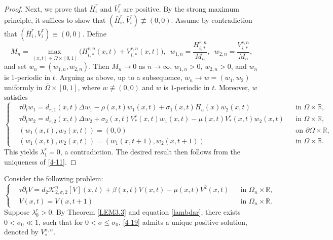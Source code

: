 \documentclass[11pt,reqno]{amsart}
\numberwithin{equation}{section}
\begin{document}
\begin{proof}
Next, we prove that $\bar{H}_{i}^{r}$ and $\bar{V}_{i}^{r}$ are positive. By the strong maximum principle, it suffices to show that
$(\bar{H}_{i}^{r},\bar{V}_{i}^{r})\not\equiv(0,0)$.
Assume by contradiction that $(\bar{H}_{i}^{r},\bar{V}_{i}^{r})\equiv(0,0)$.
Define
\begin{equation*}
M_{n}=\max_{(x,t)\in\bar{\Omega}\times[0,1]}
\big(H_{i,*}^{r,n}(x,t)+V_{i,*}^{r,n}(x,t)\big),
\enspace
w_{1,n}=\frac{H_{i,*}^{r,n}}{M_{n}},\enspace
w_{2,n}=\frac{V_{i,*}^{r,n}}{M_{n}},
\end{equation*}
and set $w_{n}=(w_{1,n},w_{2,n})$.
Then $M_{n}\to 0$ as $n\to\infty$, $w_{1,n}>0$, $w_{2,n}>0$, and $w_{n}$ is $1$-periodic in $t$.
Arguing as above, up to a subsequence, $w_{n}\to w=(w_{1},w_{2})$ uniformly in
$\bar{\Omega}\times[0,1]$, where $w\not\equiv(0,0)$ and $w$ is $1$-periodic in $t$.
Moreover, $w$ satisfies
\begin{equation*}
\left\{
\begin{aligned}
&\tau \partial_{t} w_{1} = d_{r,1}(x,t)\Delta w_{1}-\rho(x,t) w_{1}(x,t)+\sigma_{1}(x,t)H_{u}(x)w_{2}(x,t) && \text{in } \Omega\times\mathbb{R},
\\
&\tau \partial_{t} w_{2} = d_{r,2}(x,t)\Delta w_{2}+\sigma_{2}(x,t)V^{r}_{*}(x,t)w_{1}(x,t)-\mu(x,t)V^{r}_{*}(x,t)w_{2}(x,t) && \text{in } \Omega\times\mathbb{R},
\\
&(w_{1}(x,t),w_{2}(x,t)) = (0,0) && \text{on } \partial\Omega\times\mathbb{R},
\\
&(w_{1}(x,t),w_{2}(x,t)) = (w_{1}(x,t+1),w_{2}(x,t+1)) && \text{in } \Omega\times\mathbb{R}.
\end{aligned}
\right.
\end{equation*}
This yields $\lambda_{1}^{r} = 0$, a contradiction. The desired result then follows from the uniqueness of \eqref{4-11}.
\end{proof}






Consider the following problem:
\begin{equation}\label{4-19}
\left\{
\begin{aligned}
&\tau\partial_{t} V = d_{2} \mathcal{K}^{n}_{2,\sigma,2} [V] (x,t) + \beta(x,t)V(x,t) - \mu(x,t) V^{2}(x,t) && \text{in } \Omega_{n}\times\mathbb{R},\\
&V(x,t) = V(x,t+1) && \text{in } \Omega_{n}\times\mathbb{R}.
\end{aligned}
\right.
\end{equation}
Suppose $\lambda_{0}^{r}>0$.
By Theorem \ref{LEM3.3} and equation \eqref{lambdar},  there exists  $0<\sigma_{0}\ll 1$, such that for $0<\sigma\leq\sigma_{0}$, \eqref{4-19} admits a unique positive solution, denoted by $V_{*}^{\sigma,n}$.
\end{document}
